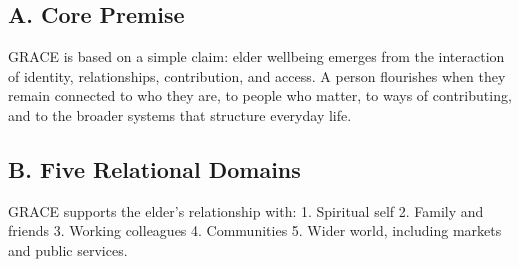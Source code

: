 \documentclass[
  journal,
]{IEEEtran}%
\begin{document}
\subsection{A. Core Premise}\label{a.-core-premise}

GRACE is based on a simple claim: elder wellbeing emerges from the
interaction of identity, relationships, contribution, and access. A
person flourishes when they remain connected to who they are, to people
who matter, to ways of contributing, and to the broader systems that
structure everyday life.

\subsection{B. Five Relational
Domains}\label{b.-five-relational-domains}

GRACE supports the elder's relationship with: 1. Spiritual self 2.
Family and friends 3. Working colleagues 4. Communities 5. Wider world,
including markets and public services.
\end{document}
